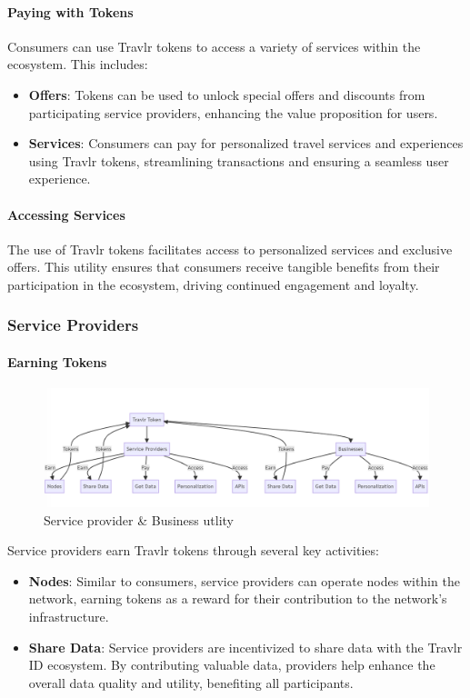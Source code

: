 \documentclass{article}
\begin{document}
\paragraph{Paying with Tokens}

Consumers can use Travlr tokens to access a variety of services within the ecosystem. This includes:
\begin{itemize}
    \item \textbf{Offers}: Tokens can be used to unlock special offers and discounts from participating service providers, enhancing the value proposition for users.
    \item \textbf{Services}: Consumers can pay for personalized travel services and experiences using Travlr tokens, streamlining transactions and ensuring a seamless user experience.

\end{itemize}

\paragraph{Accessing Services}

The use of Travlr tokens facilitates access to personalized services and exclusive offers. This utility ensures that consumers receive tangible benefits from their participation in the ecosystem, driving continued engagement and loyalty.

\subsubsection{Service Providers}

\paragraph{Earning Tokens}
\begin{figure}
    \centering
    \includegraphics[width=0.8\linewidth]{travlr_diagram_3.png}
    \caption{Service provider \& Business utlity}
    \label{fig:enter-label}
\end{figure}
Service providers earn Travlr tokens through several key activities:
\begin{itemize}
    \item \textbf{Nodes}: Similar to consumers, service providers can operate nodes within the network, earning tokens as a reward for their contribution to the network's infrastructure.
    \item \textbf{Share Data}: Service providers are incentivized to share data with the Travlr ID ecosystem. By contributing valuable data, providers help enhance the overall data quality and utility, benefiting all participants.
\end{itemize}
\end{document}
